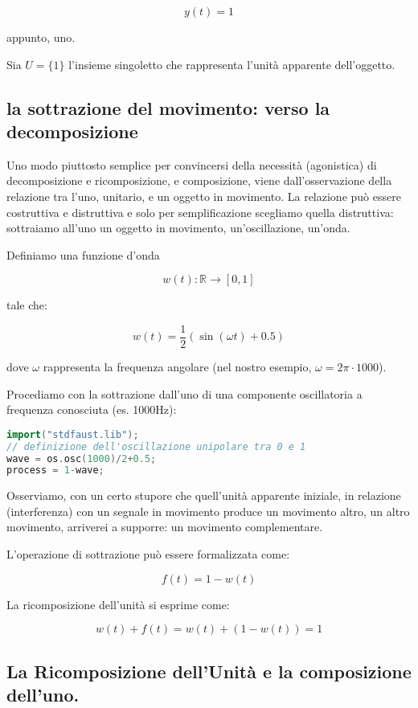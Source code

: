 \documentclass{gs-adonis}
\begin{document}
\[y(t)=1\]

appunto, uno.

Sia \(U = \{1\}\) l'insieme singoletto che rappresenta l'unità apparente
dell'oggetto.

\subsection{la sottrazione del movimento: verso la
decomposizione}\label{la-sottrazione-del-movimento-verso-la-decomposizione}

Uno modo piuttosto semplice per convincersi della necessità (agonistica)
di decomposizione e ricomposizione, e composizione, viene
dall'osservazione della relazione tra l'uno, unitario, e un oggetto in
movimento. La relazione può essere costruttiva e distruttiva e solo per
semplificazione scegliamo quella distruttiva: sottraiamo all'uno un
oggetto in movimento, un'oscillazione, un'onda.

Definiamo una funzione d'onda

\[w(t): \mathbb{R} \to [0,1]\]

tale che:

\[w(t) = \frac{1}{2}(\sin(\omega t) + 0.5)\]

dove \(\omega\) rappresenta la frequenza angolare (nel nostro esempio,
\(\omega = 2\pi \cdot 1000\)).

Procediamo con la sottrazione dall'uno di una componente oscillatoria a
frequenza conosciuta (es. 1000Hz):

\begin{lstlisting}[language={C++}]
import("stdfaust.lib");
// definizione dell'oscillazione unipolare tra 0 e 1
wave = os.osc(1000)/2+0.5;
process = 1-wave;
\end{lstlisting}

Osserviamo, con un certo stupore che quell'unità apparente iniziale, in
relazione (interferenza) con un segnale in movimento produce un
movimento altro, un altro movimento, arriverei a supporre: un movimento
complementare.

L'operazione di sottrazione può essere formalizzata come:

\[f(t) = 1 - w(t)\]

La ricomposizione dell'unità si esprime come:

\[w(t) + f(t) = w(t) + (1 - w(t)) = 1\]

\subsection{La Ricomposizione dell'Unità e la composizione
dell'uno.}\label{la-ricomposizione-dellunituxe0-e-la-composizione-delluno.}
\end{document}
